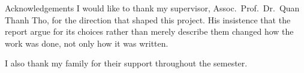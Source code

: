 \begin{preface}{Acknowledgements}
  I would like to thank my supervisor, Assoc.~Prof.~Dr.~Quan Thanh Tho, for the
  direction that shaped this project. His insistence that the report argue for
  its choices rather than merely describe them changed how the work was done,
  not only how it was written.

  \noindent I also thank my family for their support throughout the semester.
\end{preface}
